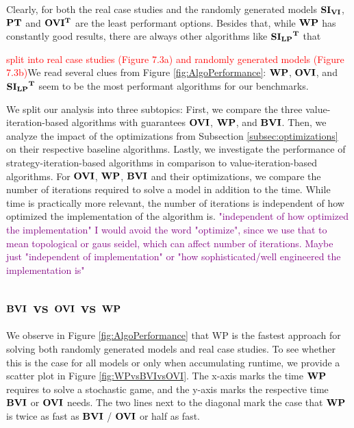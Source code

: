 
Clearly, for both the real case studies and the randomly generated models $\mathbf{SI_{VI}}$, $\mathbf{PT}$ and $\mathbf{OVI^T}$ are the least performant options.
Besides that, while $\mathbf{WP}$ has constantly good results, there are always other algorithms like $\mathbf{\mathbf{SI_{LP}}^T}$ that 

\textcolor{red}{split into real case studies (Figure 7.3a) and randomly generated models (Figure 7.3b)}We read several clues from Figure \ref{fig:AlgoPerformance}:
$\mathbf{WP}$, $\mathbf{OVI}$, and $\mathbf{\mathbf{SI_{LP}}^T}$ seem to be the most performant algorithms for our benchmarks.

We split our analysis into three subtopics: 
First, we compare the three value-iteration-based algorithms with guarantees $\mathbf{OVI}$, $\mathbf{WP}$, and $\mathbf{BVI}$. 
Then, we analyze the impact of the optimizations from Subsection \ref{subsec:optimizations} on their respective baseline algorithms.
Lastly, we investigate the performance of strategy-iteration-based algorithms in comparison to value-iteration-based algorithms.
For $\mathbf{OVI}$, $\mathbf{WP}$, $\mathbf{BVI}$ and their optimizations, we compare the number of iterations required to solve a model in addition to the time.
While time is practically more relevant, the number of iterations is independent of how optimized the implementation of the algorithm is.
\textcolor{purple}{"independent of how optimized the implementation" I would avoid the word "optimize", since we use that to mean topological or gaus seidel, which can affect number of iterations. Maybe just "independent of implementation" or "how sophisticated/well engineered the implementation is"}
\FloatBarrier

\subsection{$\mathbf{BVI}$ vs $\mathbf{OVI}$ vs $\mathbf{WP}$}
We observe in Figure \ref{fig:AlgoPerformance} that WP is the fastest approach for solving both randomly generated models and real case studies.
To see whether this is the case for all models or only when accumulating runtime, we provide a scatter plot in Figure \ref{fig:WPvsBVIvsOVI}.
The x-axis marks the time $\mathbf{WP}$ requires to solve a stochastic game, and the y-axis marks the respective time $\mathbf{BVI}$ or $\mathbf{OVI}$ needs.
The two lines next to the diagonal mark the case that $\mathbf{WP}$ is twice as fast as $\mathbf{BVI}$ / $\mathbf{OVI}$ or half as fast.

